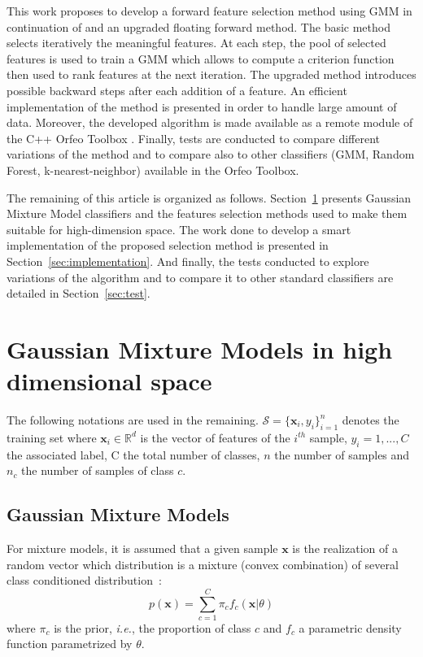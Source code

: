 \documentclass[journal,peerreview,onecolumn]{IEEEtran}
\begin{document}
This work proposes to develop a forward feature selection method using GMM in continuation of \cite{fauvel2015fast} and an upgraded floating forward method. The basic method selects iteratively the meaningful features. At each step, the pool of selected features is used to train a GMM which allows to compute a criterion function then used to rank features at the next iteration. The upgraded method introduces possible backward steps after each addition of a feature. An efficient implementation of the method is presented in order to handle large amount of data. Moreover, the developed algorithm is made available as a remote module of the C++ Orfeo Toolbox \cite{christophe2008orfeo}. Finally, tests are conducted to compare different variations of the method and to compare also to other classifiers (GMM, Random Forest, k-nearest-neighbor) available in the Orfeo Toolbox.

The remaining of this article is organized as follows. Section~\ref{sec:gmm-hd} presents Gaussian Mixture Model classifiers and the features selection methods used to make them suitable for high-dimension space. The work done to develop a smart implementation of the proposed selection method is presented in Section~\ref{sec:implementation}. And finally, the tests conducted to explore variations of the algorithm and to compare it to other standard classifiers are detailed in Section~\ref{sec:test}.

\section{Gaussian Mixture Models in high dimensional space}
\label{sec:gmm-hd}

The    following    notations    are   used    in    the    remaining.
$\mathcal{S}  = \{\mathbf{x}_i,y_i\}_{i=1}^{n}$  denotes the  training
set where $\mathbf{x}_i \in \mathbb{R}^d$ is the vector of features of
the $i^{th}$ sample, $y_i = 1,...,C$ the associated label, C the total
number of classes,  $n$ the number of samples and  $n_c$ the number of
samples of class $c$.

    \subsection{Gaussian Mixture Models}

    For mixture models, it is assumed  that a given sample $\mathbf{x}$ is
    the realization  of a  random vector which  distribution is  a mixture
    (convex     combination)     of      several     class     conditioned
    distribution~\cite{Fraley00model-basedclustering}:
    \begin{equation}
        p(\mathbf{x}) = \sum_{c=1}^{C} \pi_c f_c(\mathbf{x}|\theta)
    \end{equation}
    where $\pi_c$ is  the prior, \emph{i.e.}, the  proportion of class
    $c$  and  $f_c$  a  parametric density  function  parametrized  by
    $\theta$.
\end{document}
